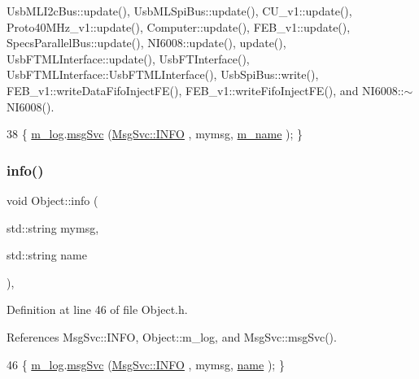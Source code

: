 Usb\+M\+L\+I2c\+Bus\+::update(), Usb\+M\+L\+Spi\+Bus\+::update(), C\+U\+\_\+v1\+::update(), Proto40\+M\+Hz\+\_\+v1\+::update(), Computer\+::update(), F\+E\+B\+\_\+v1\+::update(), Specs\+Parallel\+Bus\+::update(), N\+I6008\+::update(), update(), Usb\+F\+T\+M\+L\+Interface\+::update(), Usb\+F\+T\+Interface(), Usb\+F\+T\+M\+L\+Interface\+::\+Usb\+F\+T\+M\+L\+Interface(), Usb\+Spi\+Bus\+::write(), F\+E\+B\+\_\+v1\+::write\+Data\+Fifo\+Inject\+F\+E(), F\+E\+B\+\_\+v1\+::write\+Fifo\+Inject\+F\+E(), and N\+I6008\+::$\sim$\+N\+I6008().


\begin{DoxyCode}
38 \{ \hyperlink{classObject_a0d269813dd7ac1f24bc143031e2963f2}{m\_log}.\hyperlink{classMsgSvc_ad25f18047920cc59a314e5098259711c}{msgSvc} (\hyperlink{classMsgSvc_ae671eb7301996cd049d2da8a65925926ad2fcf3f3e734fc41ee097cc23670ce51}{MsgSvc::INFO}    , mymsg, \hyperlink{classObject_a8b83c95c705d2c3ba0d081fe1710f48d}{m\_name} ); \}
\end{DoxyCode}
\mbox{\label{classObject_a1ca123253dfd30fc28b156f521dcbdae}} 
\subsubsection{\texorpdfstring{info()}{info()}\hspace{0.1cm}{\footnotesize\ttfamily [2/2]}}
{\footnotesize\ttfamily void Object\+::info (\begin{DoxyParamCaption}\item[{std\+::string}]{mymsg,  }\item[{std\+::string}]{name }\end{DoxyParamCaption})\hspace{0.3cm}{\ttfamily [inline]}, {\ttfamily [inherited]}}



Definition at line 46 of file Object.\+h.



References Msg\+Svc\+::\+I\+N\+FO, Object\+::m\+\_\+log, and Msg\+Svc\+::msg\+Svc().


\begin{DoxyCode}
46 \{ \hyperlink{classObject_a0d269813dd7ac1f24bc143031e2963f2}{m\_log}.\hyperlink{classMsgSvc_ad25f18047920cc59a314e5098259711c}{msgSvc} (\hyperlink{classMsgSvc_ae671eb7301996cd049d2da8a65925926ad2fcf3f3e734fc41ee097cc23670ce51}{MsgSvc::INFO}    , mymsg, \hyperlink{classObject_a300f4c05dd468c7bb8b3c968868443c1}{name} ); \}
\end{DoxyCode}
\mbox{\label{classUsbFTInterface_a5371fe7b447850599eaec81a0ffa2ba0}} 
